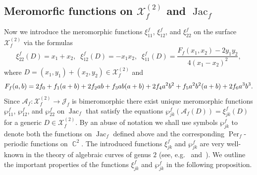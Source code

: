 \documentclass{amsart}
\numberwithin{equation}{section}
\theoremstyle{definition}
\theoremstyle{remark}
\DeclareMathOperator{\Jac}{Jac}
\DeclareMathOperator{\CC}{\mathbb C}
\DeclareMathOperator{\Per}{Per}
\begin{document}
	\subsection{Meromorfic functions on \texorpdfstring{$\mathcal X_f^{(2)}$ and $\Jac_f$}.} Now we introduce the meromorphic functions $\xi^f_{11}$, $\xi_{12}^f$, and $\xi_{22}^f$ on the surface $\mathcal X_f^{(2)}$ via the formulas
	\begin{equation*}
		\xi^f_{22}(D) = x_1 + x_2,\;\;\xi^f_{12}(D) = -x_1x_2,\;\;\xi^f_{11}(D) = \frac{F_f(x_1,x_2) - 2y_1y_2}{4(x_1 - x_2)^2},
	\end{equation*}
	where $D = (x_1,y_1) + (x_2,y_2) \in \mathcal X_f^{(2)}$ and 
	\begin{equation*}
		F_f(a,b) = \\ 2f_0 + f_1(a + b) + 2f_2ab + f_3ab(a + b) + 2f_4a^2b^2 + f_5a^2b^2(a + b) + 2f_6a^3b^3.
	\end{equation*}
	Since $\mathscr A_f:\mathcal X_f^{(2)} \to \mathscr J_f$ is bimeromorphic there exist unique meromorphic functions $\wp^f_{11}$, $\wp^f_{12}$, and $\wp^f_{22}$ on $\Jac_f$ that satisfy the equations $\wp^f_{jk}(\mathscr A_f(D)) = \xi^f_{jk}(D)$ for a generic $D \in \mathcal X_f^{(2)}$. By an abuse of notation we shall use symbols $\wp^f_{jk}$ to denote both the functions on $\Jac_f$ defined above and the corresponding $\Per_f$-periodic functions on $\CC^2$. The introduced functions $\xi^f_{jk}$ and $\wp_{jk}^f$ are very well-known in the theory of algebraic curves of genus $2$ (see, e.g.~\cite{CasselsFlynn} and~\cite{baker}). 
	We outline the important properties of the functions $\xi^f_{jk}$ and $\wp^f_{jk}$ in the following proposition.
\end{document}

